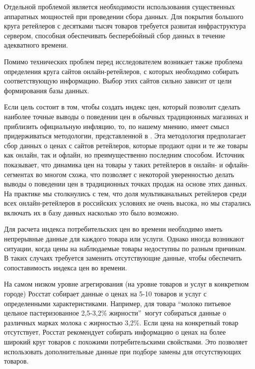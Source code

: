Отдельной проблемой является необходимости использования существенных аппаратных мощностей при проведении сбора данных. Для покрытия большого круга ретейлеров с десятками тысяч товаров требуется развитая инфраструктура сервером, способная обеспечивать бесперебойный сбор данных в течение адекватного времени.

Помимо технических проблем перед исследователем возникает также проблема определения круга сайтов онлайн-ретейлеров, с которых необходимо собирать соответствующую информацию. Выбор этих сайтов сильно зависит от цели формирования базы данных. 

Если цель состоит в том, чтобы создать индекс цен, который позволит сделать наиболее точные выводы о поведении цен в обычных традиционных магазинах и приблизить официальную инфляцию, то, по нашему мнению, имеет смысл придерживаться методологии, представленной в \cite{cavallo2016billion}. Эта методология предполагает сбор данных о ценах с сайтов ретейлеров, которые продают одни и те же товары как онлайн, так и офлайн, но преимущественно последним способом. Источник \cite{cavallo2016online} показывает, что динамика цен на товары у таких ретейлеров в онлайн- и офлайн-сегментах во многом схожа, что позволяет с некоторой уверенностью делать выводы о поведении цен в традиционных точках продаж на основе этих данных. На практике мы столкнулись с тем, что доля мультиканальных ретейлеров среди всех онлайн-ретейлеров в российских условиях не очень высока, но мы старались включать их в базу данных насколько это было возможно.


Для расчета индекса потребительских цен во времени необходимо иметь непрерывные данные для каждого товара или услуги. Однако иногда возникают ситуации, когда цены на наблюдаемые товары недоступны по разным причинам. В таких случаях требуется заменить отсутствующие данные, чтобы обеспечить сопоставимость индекса цен во времени.

На самом низком уровне агрегирования (на уровне товаров и услуг в конкретном городе) Росстат собирает данные о ценах на 5-10 товаров и услуг с определенными характеристиками. Например, для товара \enquote{молоко питьевое цельное пастеризованное 2,5-3,2\% жирности}~могут собираться данные о различных марках молока с жирностью 3,2\%. Если цена на конкретный товар отсутствует, Росстат рекомендует собирать информацию о ценах на более широкий круг товаров с похожими потребительскими свойствами. Это позволяет использовать дополнительные данные при подборе замены для отсутствующих товаров.

